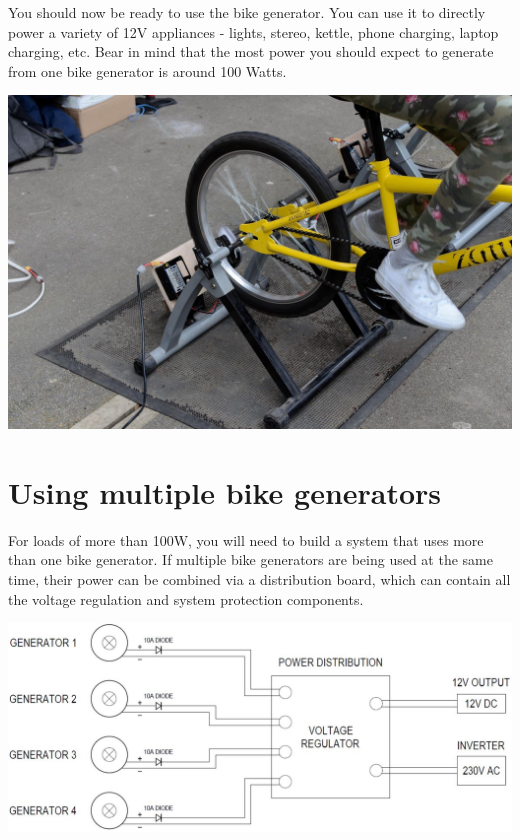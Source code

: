 \documentclass{article}
\theoremstyle{definition}
\theoremstyle{definition}
\theoremstyle{remark}
\begin{document}
  You should now be ready to use the bike generator. You can use it to directly power a variety of 12V appliances - lights, stereo, kettle, phone charging, laptop charging, etc. Bear in mind that the most power you should expect to generate from one bike generator is around 100 Watts.

  \begin{center}
    \includegraphics[width=0.45\paperwidth]{../Images/image_4_4_(generator_for_use).png}
  \end{center}


{\color{blue}\section{Using multiple bike generators}} %
\label{sec:using_multiple_bike_generators}

  For loads of more than 100W, you will need to build a system that uses more than one bike generator. If multiple bike generators are being used at the same time, their power can be combined via a distribution board, which can contain all the voltage regulation and system protection components. 

  \begin{center}
    \includegraphics[width=0.75\paperwidth]{Images/image_5_1_(multiple_generator_diagram).png}
  \end{center}
\end{document}
